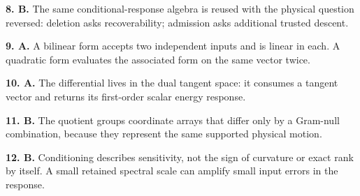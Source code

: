 \documentclass[10pt,twocolumn]{article}
\begin{document}
\textbf{8. B.} The same conditional-response algebra is reused with the
physical question reversed: deletion asks recoverability; admission asks
additional trusted descent.

\textbf{9. A.} A bilinear form accepts two independent inputs and is linear in
each. A quadratic form evaluates the associated form on the same vector twice.

\textbf{10. A.} The differential lives in the dual tangent space: it consumes
a tangent vector and returns its first-order scalar energy response.

\textbf{11. B.} The quotient groups coordinate arrays that differ only by a
Gram-null combination, because they represent the same supported physical
motion.

\textbf{12. B.} Conditioning describes sensitivity, not the sign of curvature
or exact rank by itself. A small retained spectral scale can amplify small
input errors in the response.
\end{document}
